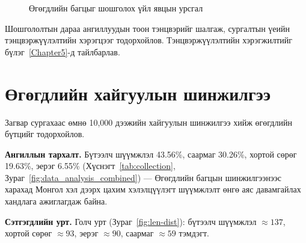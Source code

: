 \begin{figure}[H]
\caption{Өгөгдлийн багцыг шошголох үйл явцын урсгал}
\label{fig:annotation-process}
\end{figure}

Шошгололтын дараа ангиллуудын тоон тэнцвэрийг шалгаж, сургалтын үеийн
тэнцвэржүүлэлтийн хэрэгцээг тодорхойлов. Тэнцвэржүүлэлтийн хэрэгжилтийг
бүлэг~\ref{Chapter5}-д тайлбарлав.

\section{Өгөгдлийн хайгуулын шинжилгээ}

Загвар сургахаас өмнө 10,000 дээжийн хайгуулын шинжилгээ хийж өгөгдлийн
бүтцийг тодорхойлов.

\textbf{Ангиллын тархалт.} Бүтээлч шүүмжлэл 43.56\%, саармаг 30.26\%, хортой сөрөг 19.63\%,
эерэг 6.55\% (Хүснэгт~\ref{tab:collection}, Зураг~\ref{fig:data_analysis_combined}) ---
Өгөгдлийн багцын шинжилгээнээс харахад Монгол хэл дээрх цахим хэлэлцүүлэгт
шүүмжлэлт өнгө аяс давамгайлах хандлага ажиглагдаж байна.

\textbf{Сэтгэгдлийн урт.} Голч урт (Зураг~\ref{fig:len-dist}): бүтээлч шүүмжлэл
$\approx 137$, хортой сөрөг $\approx 93$, эерэг $\approx 90$, саармаг $\approx 59$ тэмдэгт.

